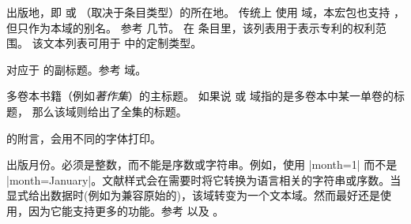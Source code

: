 \begin{fieldlist}

出版地，即  或  （取决于条目类型）的所在地。
传统上 \BibTeX 使用  域，本宏包也支持 ，但只作为本域的别名。
参考  几节。
在  条目里，该列表用于表示专利的权利范围。
该文本列表可用于  中的定制类型。




对应于  的副标题。参考  域。




多卷本书籍（例如\emph{著作集}）的主标题。
如果说  或  域指的是多卷本中某一单卷的标题，
那么该域则给出了全集的标题。




 的附言，会用不同的字体打印。




出版月份。必须是整数，而不能是序数或字符串。例如，使用 |month={1}| 而不是 |month={January}|。文献样式会在需要时将它转换为语言相关的字符串或序数。当显式给出数据时(例如为兼容原始的\bibtex )，该域转变为一个文本域。然而最好还是使用，因为它能支持更多的功能。参考  以及 。


\end{fieldlist}
